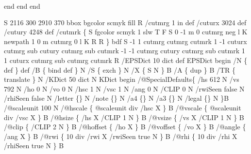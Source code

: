 \documentclass[11pt]{article}
\def\nwendcode{\endtrivlist \endgroup} %
\let\nwdocspar=\par                    %
\begin{document}
end %
end %
end %
\nwendcode{}\nwdocspar

\nwenddocs{}\endmoddef
%
%
%
S 2116 300 2910 370 bbox bgcolor scmyk fill R %
/cutmrg 1 in def
/cuturx 3024 def %
/cutury 4248 def %
/cutmrk \{ S fgcolor scmyk 1 slw T F S 0 -1 m 0 cutmrg neg l K newpath 1 0 m cutmrg 0 l K R R \} bdf 
S
-1  1   cutmrg              cutmrg              cutmrk
 1 -1   cuturx cutmrg sub   cutury cutmrg sub   cutmrk
-1 -1   cutmrg              cutury cutmrg sub   cutmrk
 1  1   cuturx cutmrg sub   cutmrg              cutmrk
R
/EPSDict 10 dict def
EPSDict begin
  /N \{ def \} def
  /B \{ bind def \} N
  /S \{ exch \} N
  /X \{ S N \} B
  /A \{ dup \} B
  /TR \{ translate \} N
  /KDict 50 dict N 
  KDict begin
    /@SpecialDefaults\{
      /hs 612 N
      /vs 792 N
      /ho 0 N
      /vo 0 N
      /hsc 1 N
      /vsc 1 N
      /ang 0 N
      /CLIP 0 N
      /rwiSeen false N
      /rhiSeen false N
      /letter \{\} N
      /note \{\} N
      /a4 \{\} N
      /a3 \{\} N
      /legal \{\} N
      \}B
    /@scaleunit 100 N
    /@hscale \{ @scaleunit div /hsc X \} B
    /@vscale \{ @scaleunit div /vsc X \} B
    /@hsize \{ /hs X /CLIP 1 N \} B
    /@vsize \{ /vs X /CLIP 1 N \} B
    /@clip \{ /CLIP 2 N \} B
    /@hoffset \{ /ho X \} B
    /@voffset \{ /vo X \} B
    /@angle \{ /ang X \} B
    /@rwi \{ 10 div /rwi X /rwiSeen true N \} B
    /@rhi \{ 10 div /rhi X /rhiSeen true N \} B
\end{document}
